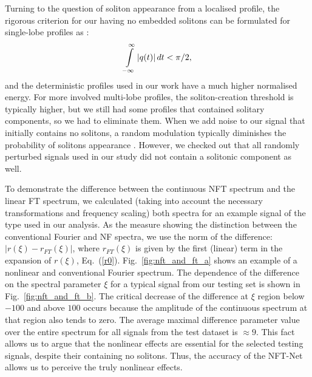 Turning to the question of soliton appearance from a localised profile, the rigorous criterion for our having no embedded solitons can be formulated for single-lobe profiles as \cite{ks03}:
\begin{equation}\label{l1}
\intop_{-\infty}^{\infty} |q(t)| \, dt < \pi/2,
\end{equation}
and the deterministic profiles used in our work have a much higher normalised energy. For more involved multi-lobe profiles, the soliton-creation threshold is typically higher, but we still had some profiles that contained solitary components, so we had to eliminate them. When we add noise to our signal that initially contains no solitons, a random modulation typically diminishes the probability of solitons appearance \cite{td08,dp08}. However, we checked out that all randomly perturbed signals used in our study did not contain a solitonic component as well.


To demonstrate the difference between the continuous NFT spectrum and the linear FT spectrum, we calculated (taking into account the necessary transformations and frequency scaling) both spectra for an example signal of the type used in our analysis.
As the measure showing the distinction between the conventional Fourier and NF spectra, we use the norm of the difference: $|r(\xi) - r_{FT}(\xi)|$, where $r_{FT}(\xi)$ is given by the first (linear) term in the expansion of $r(\xi)$, Eq.~(\ref{r0}).
Fig.~\ref{fig:nft_and_ft_a} shows an example of a nonlinear and conventional Fourier spectrum.
The dependence of the difference on the spectral parameter $\xi$ for a typical signal from our testing set is shown in Fig.~\ref{fig:nft_and_ft_b}.
The critical decrease of the difference at $\xi$ region below $-100$ and above $100$ occurs because the amplitude of the continuous spectrum at that region also tends to zero. The average maximal difference parameter value over the entire spectrum for all signals from the test dataset is $\approx 9$. 
This fact allows us to argue that the nonlinear effects are essential for the selected testing signals, despite their containing no solitons.
Thus, the accuracy of the NFT-Net allows us to perceive the truly nonlinear effects. 

